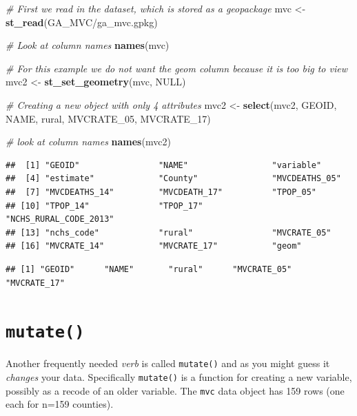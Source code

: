 \documentclass[
]{book}
\newenvironment{Shaded}{\begin{snugshade}}{\end{snugshade}}
\newcommand{\CommentTok}[1]{\textcolor[rgb]{0.56,0.35,0.01}{\textit{#1}}}
\newcommand{\ConstantTok}[1]{\textcolor[rgb]{0.56,0.35,0.01}{#1}}
\newcommand{\FunctionTok}[1]{\textcolor[rgb]{0.13,0.29,0.53}{\textbf{#1}}}
\newcommand{\NormalTok}[1]{#1}
\newcommand{\OtherTok}[1]{\textcolor[rgb]{0.56,0.35,0.01}{#1}}
\newcommand{\StringTok}[1]{\textcolor[rgb]{0.31,0.60,0.02}{#1}}
\begin{document}
\begin{Shaded}
\begin{Highlighting}[]
\CommentTok{\# First we read in the dataset, which is stored as a geopackage}
\NormalTok{mvc }\OtherTok{\textless{}{-}} \FunctionTok{st\_read}\NormalTok{(}\StringTok{\textquotesingle{}GA\_MVC/ga\_mvc.gpkg\textquotesingle{}}\NormalTok{)}

\CommentTok{\# Look at column names}
\FunctionTok{names}\NormalTok{(mvc)}

\CommentTok{\# For this example we do not want the geom column because it is too big to view}
\NormalTok{mvc2 }\OtherTok{\textless{}{-}} \FunctionTok{st\_set\_geometry}\NormalTok{(mvc, }\ConstantTok{NULL}\NormalTok{)}

\CommentTok{\# Creating a new object with only 4 attributes}
\NormalTok{mvc2 }\OtherTok{\textless{}{-}} \FunctionTok{select}\NormalTok{(mvc2, GEOID, NAME, rural, MVCRATE\_05, MVCRATE\_17)}

\CommentTok{\# look at column names}
\FunctionTok{names}\NormalTok{(mvc2)}
\end{Highlighting}
\end{Shaded}

\begin{verbatim}
##  [1] "GEOID"                "NAME"                 "variable"            
##  [4] "estimate"             "County"               "MVCDEATHS_05"        
##  [7] "MVCDEATHS_14"         "MVCDEATH_17"          "TPOP_05"             
## [10] "TPOP_14"              "TPOP_17"              "NCHS_RURAL_CODE_2013"
## [13] "nchs_code"            "rural"                "MVCRATE_05"          
## [16] "MVCRATE_14"           "MVCRATE_17"           "geom"
\end{verbatim}

\begin{verbatim}
## [1] "GEOID"      "NAME"       "rural"      "MVCRATE_05" "MVCRATE_17"
\end{verbatim}

\hypertarget{mutate}{%
\section{\texorpdfstring{\texttt{mutate()}}{mutate()}}\label{mutate}}

Another frequently needed \emph{verb} is called \texttt{mutate()} and as you might guess it \emph{changes} your data. Specifically \texttt{mutate()} is a function for creating a new variable, possibly as a recode of an older variable. The \texttt{mvc} data object has 159 rows (one each for n=159 counties).
\end{document}
